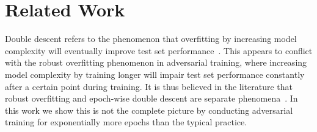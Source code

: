 \section{Related Work}
\label{sect:related}





Double descent refers to the phenomenon that overfitting by increasing model complexity will eventually improve test set performance~\citep{Neyshabur2017ExploringGI, Belkin2019ReconcilingMM}.
This appears to conflict with the robust overfitting phenomenon in adversarial training, where increasing model complexity by training longer will impair test set performance constantly after a certain point during training. It is thus believed in the literature that robust overfitting and epoch-wise double descent are separate phenomena~\citep{Rice2020OverfittingIA}. In this work we show this is not the complete picture by conducting adversarial training for exponentially more epochs than the typical practice.

